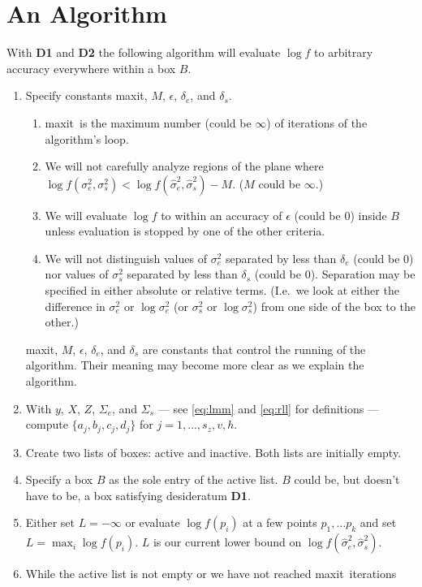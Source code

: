 \documentclass{report}
\newcommand{\textcompute}{\textsf}
\newcommand{\RL}{f}
\newcommand{\logRL}{\log\RL}
\newcommand{\sigssq}{\sigma_s^2}
\newcommand{\sigesq}{\sigma_e^2}
\newcommand{\sshat}{\hat\sigma^2_e,\hat\sigma^2_s}
\newcommand{\logRLss}{\logRL(\sigesq,\sigssq)}
\newcommand{\maxit}{\textcompute{maxit}}
\begin{document}
\section{An Algorithm}
With \textbf{D1} and \textbf{D2} the following  algorithm will evaluate $\logRL$ to arbitrary accuracy everywhere within a box $B$.
\begin{enumerate}
\item Specify constants \maxit, $M$, $\epsilon$, $\delta_e$, and $\delta_s$.
	\begin{enumerate}[label=(\alph*)]
	\item \maxit\ is the maximum number (could be $\infty$) of iterations of
		the algorithm's loop.
	\item We will not carefully analyze regions of the plane where
		$\logRLss < \logRL(\sshat) - M$.  ($M$ could be $\infty$.)
	\item We will evaluate $\logRL$ to within an accuracy of $\epsilon$ (could be 0) inside $B$
	         unless evaluation is stopped by one of the other criteria.
	\item We will not distinguish values of $\sigesq$ separated by less
		than $\delta_e$ (could be 0) nor values of $\sigssq$ separated by
		less than $\delta_s$ (could be 0).  Separation may be specified
		in either absolute or relative terms. (I.e.\ we look at either the difference
		in $\sigesq$ or $\log\sigesq$ (or $\sigssq$ or $\log\sigssq$) from one
		side of the box to the other.)
	\end{enumerate}
	\maxit, $M$, $\epsilon$, $\delta_e$, and $\delta_s$ are constants that
	control the running of the algorithm.  Their meaning may become more
	clear as we explain the algorithm.
\item With $y$, $X$, $Z$, $\Sigma_e$, and $\Sigma_s$ --- see \eqref{eq:lmm}
	and \eqref{eq:rll} for definitions --- compute $\{a_j, b_j, c_j, d_j\}$ for $j=1,
	\dots, s_z, v, h$.
\item Create two lists of boxes: active and inactive.  Both lists are initially empty.
\item Specify a box $B$ as the sole entry of the active list.  $B$ could be,
	but doesn't have to be, a box satisfying desideratum \textbf{D1}.
\item Either set $L = -\infty$ or evaluate $\logRL(p_i)$ at a few points
	$p_1, \dots p_k$ and set $L = \max_i\logRL(p_i)$.  $L$ is our current
	lower bound on $\logRL(\sshat)$.
\item While the active list is not empty or we have not reached \maxit\
	iterations

\end{enumerate}
\end{document}
